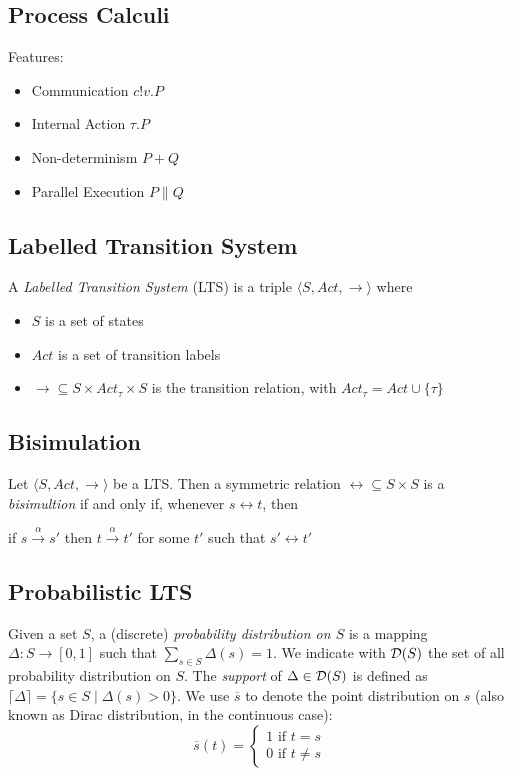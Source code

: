 \subsection{Process Calculi}

Features: \begin{itemize}
\item Communication $c!v.P$
\item Internal Action $\tau.P$
\item Non-determinism $P + Q$
\item Parallel Execution $P \parallel Q$
\end{itemize}

\subsection{Labelled Transition System}

A \textit{Labelled Transition System} (LTS) is a triple $\langle S , Act, \rightarrow \rangle$ where \begin{itemize}
\item $S$ is a set of states
\item $Act$ is a set of transition labels
\item $\rightarrow 	\subseteq S\times Act_\tau \times S$ is the transition relation, with $Act_\tau = Act \cup \{\tau\}$
\end{itemize} 

\subsection{Bisimulation}

Let $\langle S , Act, \rightarrow \rangle$ be a LTS. Then a symmetric relation $\rel \subseteq S \times S$ is a \textit{bisimultion} if and only if, whenever $s \rel t$, then 
\begin{center}
if $s \xrightarrow{\alpha} s'$ then $t \xrightarrow{\alpha} t'$ for some $t'$ such that $s' \rel t'$
\end{center}


\subsection{Probabilistic LTS}

Given a set $S$, a (discrete) \textit{probability distribution on $S$} is a mapping $\Delta: S \rightarrow [0, 1]$ such that $\sum_{s\in S} \Delta(s) = 1$. We indicate with $\mathcal{D}(S)$ the set of all probability distribution on $S$.
The \textit{support} of $\Delta \in \mathcal{D}(S)$ is defined as $\lceil\Delta\rceil = \{s \in S \mid \Delta(s) > 0\}$. We use $\overline{s}$ to denote the point distribution on $s$ (also known as Dirac distribution, in the continuous case):
\[
	\overline{s}(t) = 
	\begin{cases} 1 \text{ if }t = s \\
	0 \text{ if } t\neq s
	\end{cases}
\]

